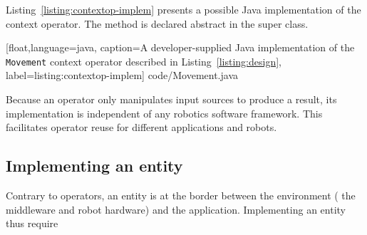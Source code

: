 Listing~\ref{listing:contextop-implem} presents a possible Java
implementation of the  context operator. The
 method is declared abstract in the
 super class.

%
[float,language=java,%
caption={A developer-supplied Java implementation of the \texttt{Movement}
  context operator described in Listing~\ref{listing:design}},%
label={listing:contextop-implem}]%
{code/Movement.java}

Because an operator only manipulates input sources to produce a
result, its implementation is independent of any robotics software
framework. This facilitates operator reuse for different applications
and robots.

\subsection{Implementing an entity}

Contrary to operators, an entity is at the border between the
environment (\eg{} the middleware and robot hardware) and the
application. Implementing an entity thus require 

